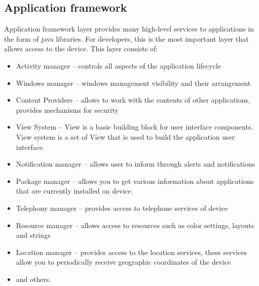\subsection{Application framework}
Application framework layer provides many high-level services to applications in the form of java libraries. For developers, this is the most important layer that allows access to the device. This layer consists of:
 
\begin{itemize} %
\item Activity manager -- controls all aspects of the application lifecycle
\item Windows manager --  windows management visibility and their arrangement
\item Content Providers -- allows to work with the contents of other applications, provides mechanisms for security
\item View System -- View is a basic building block for user interface components. View system is a set of View that is used to build the application user interface.
\item Notification manager -- allows user to inform through alerts and notifications
\item Package manager -- allows you to get various information about applications that are currently installed on device.
\item Telephony manager -- provides access to telephone services of device
\item Resource manager -- allows access to resources such as color settings, layouts and strings
\item Location manager -- provides access to the location services, these services allow you to periodically receive geographic coordinates of the device
\item and others.
\end{itemize}

